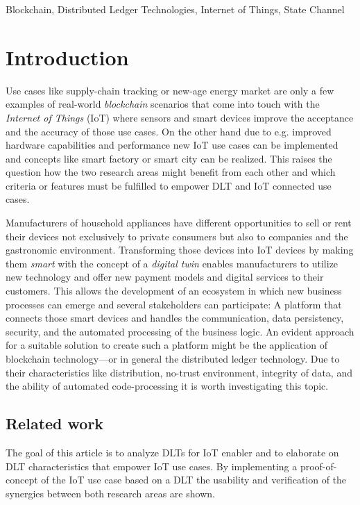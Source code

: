 \documentclass[conference]{IEEEtran}
\begin{document}
\begin{IEEEkeywords}
Blockchain, Distributed Ledger Technologies, Internet of Things, State Channel
\end{IEEEkeywords}

%
\section{Introduction}

Use cases like supply-chain tracking or new-age energy market are only a few examples of real-world \emph{blockchain} scenarios that come into touch with the \emph{Internet of Things} (IoT) where sensors and smart devices improve the acceptance and the accuracy of those use cases. On the other hand due to e.g. improved hardware capabilities and performance new IoT use cases can be implemented and concepts like smart factory or smart city can be realized. This raises the question how the two research areas might benefit from each other and which criteria or features must be fulfilled to empower DLT and IoT connected use cases.

Manufacturers of household appliances have different opportunities to sell or rent their devices not exclusively to private consumers but also to companies and the gastronomic environment. Transforming those devices into IoT devices by making them \emph{smart} with the concept of a \emph{digital twin} enables manufacturers to utilize new technology and offer new payment models and digital services to their customers. This allows the development of an ecosystem in which new business processes can emerge and several stakeholders can participate: A platform that connects those smart devices and handles the communication, data persistency, security, and the automated processing of the business logic. An evident approach for a suitable solution to create such a platform might be the application of blockchain technology---or in general the distributed ledger technology. Due to their characteristics like distribution, no-trust environment, integrity of data, and the ability of automated code-processing it is worth investigating this topic.

%
\subsection{Related work}

The goal of this article is to analyze DLTs for IoT enabler and to elaborate on DLT characteristics that empower IoT use cases. By implementing a proof-of-concept of the IoT use case based on a DLT the usability and verification of the synergies between both research areas are shown.
\end{document}
